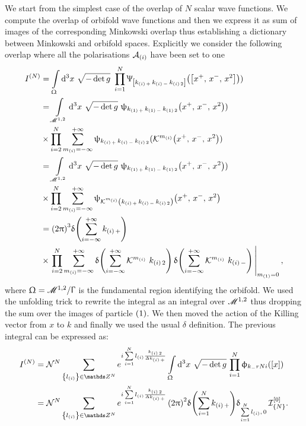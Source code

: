 We start from the simplest case of the overlap of $N$ scalar wave functions.
We compute the overlap of orbifold wave functions and then we express it as sum of images of the corresponding Minkowski overlap thus establishing a dictionary between Minkowski and orbifold spaces.
Explicitly we consider the following overlap where all the polarisations $\mathcal{A}_{(i)}$ have been set to one
\begin{equation}
  \begin{split}
    I^{(N)}
    & =
    \int\limits_{\Omega} \dd[3]{x}\,
    \sqrt{-\det g}~
    \finiteprod{i}{1}{N} \Psi_{\qty[k_{\qty(i)\, +}\, k_{\qty(i)\, -}\, k_{\qty(i)\, 2}]}\qty(\qty[x^+,\, x^-,\, x^2]))
    \\
    & =
    \int\limits_{\ccM^{1,2}} \dd[3]{x}\,
    \sqrt{-\det g}~
    \psi_{k_{\qty(1)\, +}\, k_{\qty(1)\, -}\, k_{\qty(1)\, 2}}\qty(x^+,\, x^-,\, x^2))\,
    \\
    & \times
    \finiteprod{i}{2}{N} \infinfsum{m_{(i)}} 
    \psi_{k_{\qty(i)\, +}\, k_{\qty(i)\, -}\, k_{\qty(i)\, 2}}( \cK^{m_{(i)} }\qty(x^+,\, x^-,\, x^2) )      
    \\
    & =    
    \int\limits_{\ccM^{1,2}} \dd[3]{x}\,
    \sqrt{-\det g}~
    \psi_{k_{\qty(1)\, +}\, k_{\qty(1)\, -}\, k_{\qty(1)\, 2}}\qty(x^+,\, x^-,\, x^2))
    \\
    & \times
    \finiteprod{i}{2}{N}  \infinfsum{m_{(i)}} 
    \psi_{\cK^{m_{(i)}}\qty(k_{\qty(i)\, +}\, k_{\qty(i)\, -}\, k_{\qty(i)\, 2}) }\qty(x^+,\, x^-,\, x^2)
    \\
    & =
    \qty(2\pi)^3
    \delta\qty(\infinfsum{i} k_{\qty(i)\, +})\,
    \\
    & \times
    \eval{%
      \finiteprod{i}{2}{N} \infinfsum{m_{(i)}} 
      \delta\qty(\infinfsum{i} \cK^{m_{(i)}}~ k_{\qty(i)\, 2} )\,
      \delta\qty(\infinfsum{i} \cK^{m_{(i)}}~ k_{\qty(i)\, -} )\,
    }_{m_{\qty(1)} = 0},
  \end{split}
\end{equation}
where $\Upomega = \mathscr{M}^{1,2} / \Upgamma$ is the fundamental region identifying the orbifold.
We used the unfolding trick to rewrite the integral as an integral over $\mathscr{M}^{1,2}$ thus dropping the sum over the images of particle $\qty(1)$.
We then moved the action of the Killing vector from $x$ to $k$ and finally we used the usual $\delta$ definition.
The previous integral can be expressed as:
\begin{equation}
  \begin{split}
    I^{(N)}
    & =
    \cN^N
    \sum_{ \qty{ l_{\qty(i)} } \in \Z^N } 
    e^{%
      i \finitesum{i}{1}{N} l_{\qty(i)} \frac{k_{\qty(i)\, 2}}{\Delta k_{\qty(i)\, +}}
    }
    \int\limits_{\Omega} \dd[3]{x}\,
    \sqrt{-\det g}\,
    \finiteprod{i}{1}{N}\phi_{k_-rN{i}}\qty(\qty[x])
    \\
    & =
    \cN^N
    \sum_{ \qty{ l_{\qty(i)} } \in \Z^N } 
    e^{%
      i \finitesum{i}{1}{N} l_{\qty(i)} \frac{k_{\qty(i)\, 2}}{\Delta k_{\qty(i)\, +}}
    }\,
    \qty(2\pi)^2
    \delta\qty( \finitesum{i}{1}{N} k_{\qty(i)\, +} )
    \delta_{\finitesum{i}{1}{N} l_{\qty(i)},\, 0}\,
    \cI_{\qty{N}}^{\qty[0]}.
  \end{split}
\end{equation}
